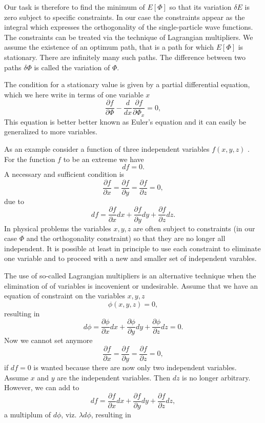 Our task is therefore to find the minimum of $E[\Phi]$ so that its variation $\delta E$ 
is zero  subject to specific
constraints. In our case the constraints appear as the integral which expresses the orthogonality of the  
single-particle wave functions.
The constraints can be treated via the technique of Lagrangian multipliers. 
We assume the existence of an optimum path, that is a path for which $E[\Phi]$ is stationary. 
There are infinitely many such paths.
The difference between two paths $\delta\Phi$ is called the variation of $\Phi$.

The condition for a stationary value is given by a partial differential equation, which we here
write in terms of one variable $x$
\[
\frac{\partial f}{\partial \Phi}-\frac{d}{dx}\frac{\partial f}{\partial \Phi_x}=0,\]
This equation is better better known as Euler's equation and it can 
easily be generalized to more variables.

As an example consider a function of three independent variables $f(x,y,z)$ . 
For the function $f$ to be an 
extreme we have
\[
df=0.
\]
A necessary and sufficient condition is
\[
\frac{\partial f}{\partial x} =\frac{\partial f}{\partial y}=\frac{\partial f}{\partial z}=0,
\]
due to 
\[
df = \frac{\partial f}{\partial x}dx+\frac{\partial f}{\partial y}dy+\frac{\partial f}{\partial z}dz.
\]
In physical problems the variables $x,y,z$ are often subject to constraints 
(in our case $\Phi$ and the orthogonality constraint)
so that they are no longer all independent. It is possible at least in principle to use each constraint to 
eliminate one variable
and to proceed with a new and smaller set of independent varables.

The use of so-called Lagrangian  multipliers is an alternative technique  when the elimination of
of variables is incovenient or undesirable.  Assume that we have an equation of constraint 
on the variables $x,y,z$
\[
\phi(x,y,z) = 0,
\]
 resulting in
\[
d\phi = \frac{\partial \phi}{\partial x}dx+\frac{\partial \phi}{\partial y}dy+\frac{\partial \phi}{\partial z}dz =0.
\]
Now we cannot set anymore 
\[
\frac{\partial f}{\partial x} =\frac{\partial f}{\partial y}=\frac{\partial f}{\partial z}=0,
\]
if $df=0$ is wanted 
because there are now only two independent variables.  Assume $x$ and $y$ are the independent variables.
Then $dz$ is no longer arbitrary. 
However, we can add to
\[
df = \frac{\partial f}{\partial x}dx+\frac{\partial f}{\partial y}dy+\frac{\partial f}{\partial z}dz,
\]
a multiplum of $d\phi$, viz. $\lambda d\phi$, resulting  in

